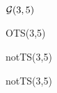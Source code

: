 \documentclass{article}
\begin{document}
\begin{figure}[H]
  
  \caption{${\cal G}(3,5)$}
\end{figure}

\begin{figure}[H]
  
  \caption{OTS(3,5)}
\end{figure}


\begin{figure}[H]
  
  \caption{notTS(3,5)}
\end{figure}

\begin{figure}[H]
  
  \caption{notTS(3,5)}
\end{figure}
\end{document}
